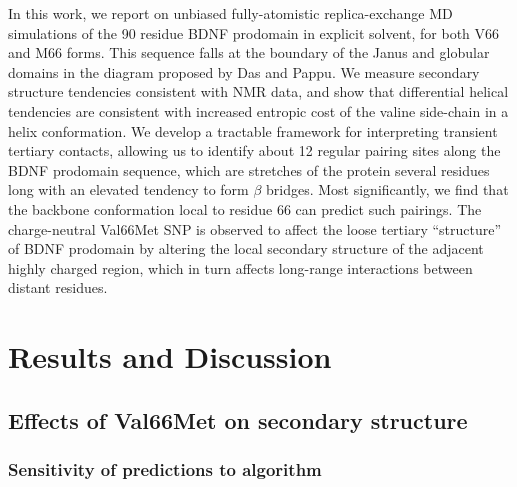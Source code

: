 \documentclass[10pt,letterpaper]{article}
\begin{document}
In this work, we report on unbiased fully-atomistic replica-exchange MD simulations of the 90 residue BDNF prodomain in explicit solvent, for both V66 and M66 forms.  This sequence falls at the boundary of the Janus and globular domains in the diagram proposed by Das and Pappu. \cite{Das2015,Das2013a} 
We measure secondary structure tendencies consistent with NMR data, and show that differential helical tendencies are consistent with increased entropic cost of the valine side-chain in a helix conformation.  We develop a tractable framework for interpreting transient tertiary contacts, allowing us to identify about 12 regular pairing sites along the BDNF prodomain  
 sequence, which are stretches of the protein several residues long with an elevated tendency to form $\beta$ bridges.  Most significantly, we find that the backbone conformation local to residue 66 can predict such pairings.  The charge-neutral Val66Met SNP is observed to affect the loose tertiary ``structure'' of BDNF prodomain 
  by altering the local secondary structure of the adjacent highly charged region, which in turn affects long-range interactions between distant residues.  




\section*{Results and Discussion}

\subsection*{Effects of Val66Met on secondary structure}

\subsubsection*{Sensitivity of predictions to algorithm}
\end{document}
